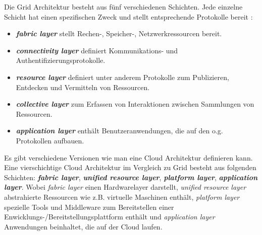 Die Grid Architektur besteht aus fünf verschiedenen Schichten. Jede einzelne Schicht hat einen spezifischen Zweck und stellt entsprechende Protokolle bereit \cite{360-degree-compared}:

\begin{itemize}
\item \textbf{\textit{fabric layer}} stellt Rechen-, Speicher-, Netzwerkressourcen bereit.
\item \textbf{\textit{connectivity layer}} definiert Kommunikations- und Authentifizierungsprotokolle.
\item \textbf{\textit{resource layer}} definiert unter anderem Protokolle zum Publizieren, Entdecken und Vermitteln von Ressourcen.
\item \textbf{\textit{collective layer}} zum Erfassen von Interaktionen zwischen Sammlungen von Ressourcen.
\item \textbf{\textit{application layer}} enthält Benutzeranwendungen, die auf den o.g. Protokollen aufbauen.
\end{itemize}

Es gibt verschiedene Versionen wie man eine Cloud Architektur definieren kann. Eine vierschichtige Cloud Architektur im Vergleich zu Grid besteht aus folgenden Schichten:
\textbf{\textit{fabric layer}}, \textbf{\textit{unified resource layer}}, \textbf{\textit{platform layer}}, \textbf{\textit{application layer}}.
Wobei \textit{fabric layer} einen Hardwarelayer darstellt, \textit{unified resource layer} abstrahierte Ressourcen wie z.B. virtuelle Maschinen enthält, \textit{platform layer} spezielle Tools und Middleware zum Bereitstellen einer Enwicklungs-/Bereitstellungsplattform enthält und \textit{application layer} Anwendungen beinhaltet, die auf der Cloud laufen.\cite{360-degree-compared}






